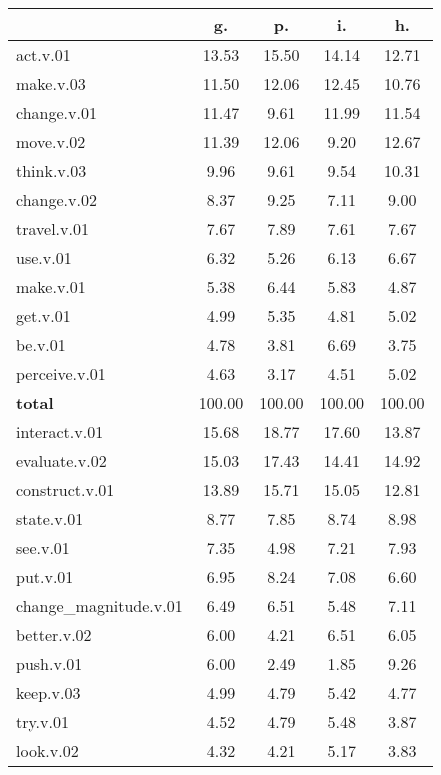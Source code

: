 \begin{table}[h!]
\begin{center}
\begin{tabular}{| l || c | c | c | c |}\hline
 & {\bf g.} & {\bf p.} & {\bf i.} & {\bf h.} \\\hline\hline
act.v.01 & 13.53  & 15.50  & 14.14  & 12.71 \\\hline
make.v.03 & 11.50  & 12.06  & 12.45  & 10.76 \\\hline
change.v.01 & 11.47  & 9.61  & 11.99  & 11.54 \\\hline
move.v.02 & 11.39  & 12.06  & 9.20  & 12.67 \\\hline
think.v.03 & 9.96  & 9.61  & 9.54  & 10.31 \\\hline
change.v.02 & 8.37  & 9.25  & 7.11  & 9.00 \\\hline
travel.v.01 & 7.67  & 7.89  & 7.61  & 7.67 \\\hline
use.v.01 & 6.32  & 5.26  & 6.13  & 6.67 \\\hline
make.v.01 & 5.38  & 6.44  & 5.83  & 4.87 \\\hline
get.v.01 & 4.99  & 5.35  & 4.81  & 5.02 \\\hline
be.v.01 & 4.78  & 3.81  & 6.69  & 3.75 \\\hline
perceive.v.01 & 4.63  & 3.17  & 4.51  & 5.02 \\\hline\hline
{{\bf total}} & 100.00  & 100.00  & 100.00  & 100.00 \\\hline\hline\hline
interact.v.01 & 15.68  & 18.77  & 17.60  & 13.87 \\\hline
evaluate.v.02 & 15.03  & 17.43  & 14.41  & 14.92 \\\hline
construct.v.01 & 13.89  & 15.71  & 15.05  & 12.81 \\\hline
state.v.01 & 8.77  & 7.85  & 8.74  & 8.98 \\\hline
see.v.01 & 7.35  & 4.98  & 7.21  & 7.93 \\\hline
put.v.01 & 6.95  & 8.24  & 7.08  & 6.60 \\\hline
change\_magnitude.v.01 & 6.49  & 6.51  & 5.48  & 7.11 \\\hline
better.v.02 & 6.00  & 4.21  & 6.51  & 6.05 \\\hline
push.v.01 & 6.00  & 2.49  & 1.85  & 9.26 \\\hline
keep.v.03 & 4.99  & 4.79  & 5.42  & 4.77 \\\hline
try.v.01 & 4.52  & 4.79  & 5.48  & 3.87 \\\hline
look.v.02 & 4.32  & 4.21  & 5.17  & 3.83 \\\hline\hline

\end{tabular}
\end{center}
\end{table}
